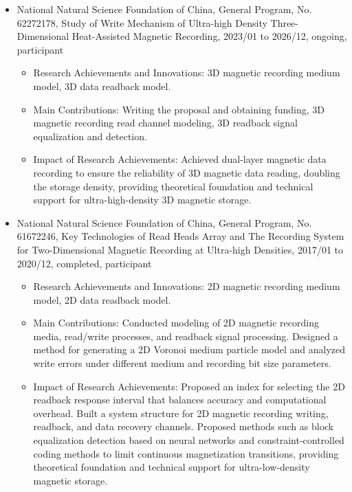 \documentclass[en]{resume}
\begin{document}
\begin{itemize}
  \item National Natural Science Foundation of China, General Program, No. 62272178, 
  Study of Write Mechanism of Ultra-high Density Three-Dimensional Heat-Assisted Magnetic Recording, 2023/01 to 2026/12, ongoing, participant
  \begin{itemize}
    \item Research Achievements and Innovations: 3D magnetic recording medium model, 3D data readback model.
    \item Main Contributions: Writing the proposal and obtaining funding, 3D magnetic recording read channel modeling, 3D readback signal equalization and detection.
    \item Impact of Research Achievements: Achieved dual-layer magnetic data recording to ensure the reliability of 3D magnetic data reading, doubling the storage density, providing theoretical foundation and technical support for ultra-high-density 3D magnetic storage.
  \end{itemize}

  \item National Natural Science Foundation of China, General Program, No. 61672246, Key Technologies of Read Heads Array and The Recording System for
  Two-Dimensional Magnetic Recording at Ultra-high Densities, 2017/01 to 2020/12, completed, participant
  \begin{itemize}
    \item Research Achievements and Innovations: 2D magnetic recording medium model, 2D data readback model.
    \item Main Contributions: Conducted modeling of 2D magnetic recording media, read/write processes, and readback signal processing. Designed a method for generating a 2D Voronoi medium particle model and analyzed write errors under different medium and recording bit size parameters.
    \item Impact of Research Achievements: Proposed an index for selecting the 2D readback response interval that balances accuracy and computational overhead. Built a system structure for 2D magnetic recording writing, readback, and data recovery channels. Proposed methods such as block equalization detection based on neural networks and constraint-controlled coding methods to limit continuous magnetization transitions, providing theoretical foundation and technical support for ultra-low-density magnetic storage.
  \end{itemize}


\end{itemize}
\end{document}
